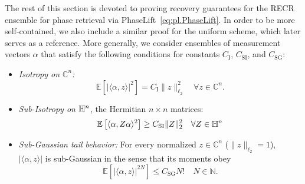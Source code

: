 The rest of this section is devoted to proving recovery guarantees for the RECR ensemble for phase retrieval via PhaseLift~\eqref{eq:pl.PhaseLift}.
In order to be more self-contained, we also include a similar proof for the uniform scheme, which later serves as a reference.
More generally, we consider ensembles of measurement vectors $\alpha$ that satisfy the following conditions for constants $C_\mathrm{I}$, $C_\mathrm{SI}$, and $C_\mathrm{SG}$:

\begin{itemize}
  \item \emph{Isotropy on $\mathbb{C}^n$:}
  \[
    \mathbb{E} \left[ | \langle \alpha,  z \rangle |^2 \right] = C_\mathrm{I} \|  z \|_{\ell_2}^2 \quad \forall  z \in \mathbb{C}^n.
    \label{eq:pl.tight_frame}
  \]

  \item \emph{Sub-Isotropy on $\mathbb{H}^n$}, the Hermitian $n \times n$ matrices:
  \begin{align}
    \mathbb{E} \left[ \langle \alpha,  Z \alpha \rangle^2 \right] \geq C_\mathrm{SI} \|  Z \|_2^2 \quad \forall  Z \in \mathbb{H}^n \label{eq:pl.sub_isotropy}
  \end{align}

  \item \emph{Sub-Gaussian tail behavior:} For every normalized $ z \in \mathbb{C}^n$ ($\|  z \|_{\ell_2}=1$), $| \langle \alpha,  z \rangle|$ is sub-Gaussian in the sense that its moments obey
  \[
    \mathbb{E} \left[ | \langle \alpha,  z \rangle|^{2N} \right] \leq C_\mathrm{SG} N! \quad N \in \mathbb{N}.
  \label{eq:pl.subexponential}
  \]
\end{itemize}

